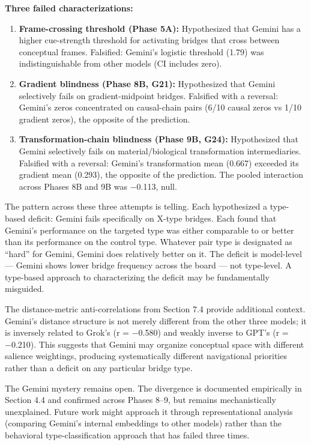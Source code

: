 \textbf{Three failed characterizations:}

\begin{enumerate}
\def\labelenumi{\arabic{enumi}.}
\item
  \textbf{Frame-crossing threshold (Phase 5A):} Hypothesized that Gemini has a higher cue-strength threshold for activating bridges that cross between conceptual frames. Falsified: Gemini's logistic threshold (1.79) was indistinguishable from other models (CI includes zero).
\item
  \textbf{Gradient blindness (Phase 8B, G21):} Hypothesized that Gemini selectively fails on gradient-midpoint bridges. Falsified with a reversal: Gemini's zeros concentrated on causal-chain pairs (6/10 causal zeros vs 1/10 gradient zeros), the opposite of the prediction.
\item
  \textbf{Transformation-chain blindness (Phase 9B, G24):} Hypothesized that Gemini selectively fails on material/biological transformation intermediaries. Falsified with a reversal: Gemini's transformation mean (0.667) exceeded its gradient mean (0.293), the opposite of the prediction. The pooled interaction across Phases 8B and 9B was −0.113, null.
\end{enumerate}

The pattern across these three attempts is telling. Each hypothesized a type-based deficit: Gemini fails specifically on X-type bridges. Each found that Gemini's performance on the targeted type was either comparable to or better than its performance on the control type. Whatever pair type is designated as ``hard'' for Gemini, Gemini does relatively better on it. The deficit is model-level --- Gemini shows lower bridge frequency across the board --- not type-level. A type-based approach to characterizing the deficit may be fundamentally misguided.

The distance-metric anti-correlations from Section 7.4 provide additional context. Gemini's distance structure is not merely different from the other three models; it is inversely related to Grok's (r = −0.580) and weakly inverse to GPT's (r = −0.210). This suggests that Gemini may organize conceptual space with different salience weightings, producing systematically different navigational priorities rather than a deficit on any particular bridge type.

The Gemini mystery remains open. The divergence is documented empirically in Section 4.4 and confirmed across Phases 8--9, but remains mechanistically unexplained. Future work might approach it through representational analysis (comparing Gemini's internal embeddings to other models) rather than the behavioral type-classification approach that has failed three times.

